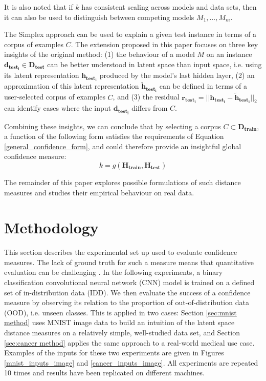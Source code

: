 \documentclass{article}
\begin{document}
It is also noted that if $k$ has consistent scaling across models and data sets, then it can also be used to distinguish between competing models ${M_1, ..., M_m}$.

The Simplex approach can be used to explain a given test instance in terms of a corpus of examples $C$. The extension proposed in this paper focuses on three key insights of the original method: (1) the behaviour of a model $M$ on an instance $\bm{d_{test_i}} \in \bm{D_{test}}$ can be better understood in latent space than input space, i.e. using its latent representation $\bm{h_{test_i}}$ produced by the model's last hidden layer, (2) an approximation of this latent representation $\bm{\tilde{h}_{test_i}}$  can be defined in terms of a user-selected corpus of examples $C$, and (3) the residual $\bm{r_{test_i}} = ||\bm{h_{test_i}} - \bm{\tilde{h}_{test_i}}||_2$ can identify cases where the input $\bm{d_{test_i}}$ differs from $C$.

Combining these insights, we can conclude that by selecting a corpus $C \subset \bm{D_{train}}$, a function of the following form satisfies the requirements of Equation \ref{general_confidence_form}, and could therefore provide an insightful global confidence measure:
\begin{equation}\label{simplex_confidence_form}
	k = g(\bm{H_{train}}, \bm{H_{test}})
\end{equation}

The remainder of this paper explores possible formulations of such distance measures and studies their empirical behaviour on real data.



\section{Methodology}

This section describes the experimental set up used to evaluate confidence measures. The lack of ground truth for such a measure means that quantitative evaluation can be challenging \cite[p.8]{papernot_deep_2018}. In the following experiments, a binary classification convolutional neural network (CNN) model is trained on a defined set of in-distribution data (IDD). We then evaluate the success of a confidence measure by observing its relation to the proportion of out-of-distribution data (OOD), i.e. unseen classes.
This is applied in two cases: Section \ref{sec:mnist method} uses MNIST image data to build an intuition of the latent space distance measures on a relatively simple, well-studied data set, and Section \ref{sec:cancer method} applies the same approach to a real-world medical use case. Examples of the inputs for these two experiments are given in Figures \ref{mnist_inputs_image} and \ref{cancer_inputs_image}.
All experiments are repeated 10 times and results have been replicated on different machines.
\end{document}

